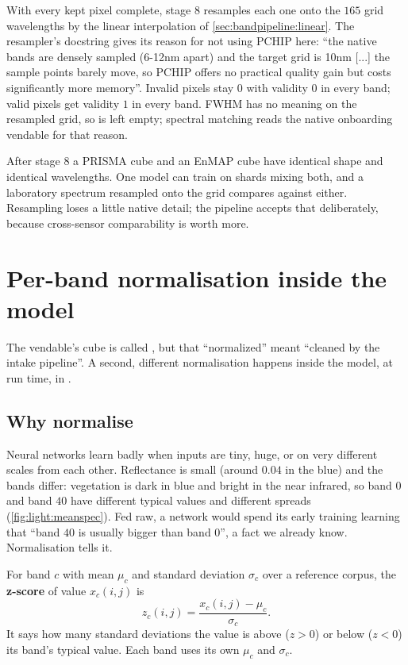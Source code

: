 With every kept pixel complete, stage 8 resamples each one onto the $165$ grid wavelengths by the
linear interpolation of \cref{sec:bandpipeline:linear}. The resampler's docstring gives its reason for
not using PCHIP here: ``the native bands are densely sampled (6-12nm apart) and the target grid is
10nm [...] the sample points barely move, so PCHIP offers no practical quality gain but costs
significantly more memory''. Invalid pixels stay $0$ with validity $0$ in every band; valid pixels
get validity $1$ in every band. FWHM has no meaning on the resampled grid, so
 is left empty; spectral matching reads the native onboarding vendable for
that reason.

After stage 8 a PRISMA cube and an EnMAP cube have identical shape and identical wavelengths. One
model can train on shards mixing both, and a laboratory spectrum resampled onto the grid compares
against either. Resampling loses a little native detail; the pipeline accepts that deliberately,
because cross-sensor comparability is worth more.

\section{Per-band normalisation inside the model}\label{sec:bandpipeline:zscore}

The vendable's cube is called , but that ``normalized'' meant
``cleaned by the intake pipeline''. A second, different normalisation happens inside the model, at
run time, in .

\subsection{Why normalise}

Neural networks learn badly when inputs are tiny, huge, or on very different scales from each other.
Reflectance is small (around $0.04$ in the blue) and the bands differ: vegetation is dark in blue and
bright in the near infrared, so band $0$ and band $40$ have different typical values and different
spreads (\cref{fig:light:meanspec}). Fed raw, a network would spend its early training learning that
``band $40$ is usually bigger than band $0$'', a fact we already know. Normalisation tells it.

\begin{definition}
For band $c$ with mean $\mu_c$ and standard deviation $\sigma_c$ over a reference corpus, the
\textbf{z-score} of value $x_c(i,j)$ is
\begin{equation}\label{eq:bandpipeline:z}
z_c(i,j) = \frac{x_c(i,j) - \mu_c}{\sigma_c}.
\end{equation}
It says how many standard deviations the value is above ($z > 0$) or below ($z < 0$) its band's
typical value. Each band uses its own $\mu_c$ and $\sigma_c$.
\end{definition}

